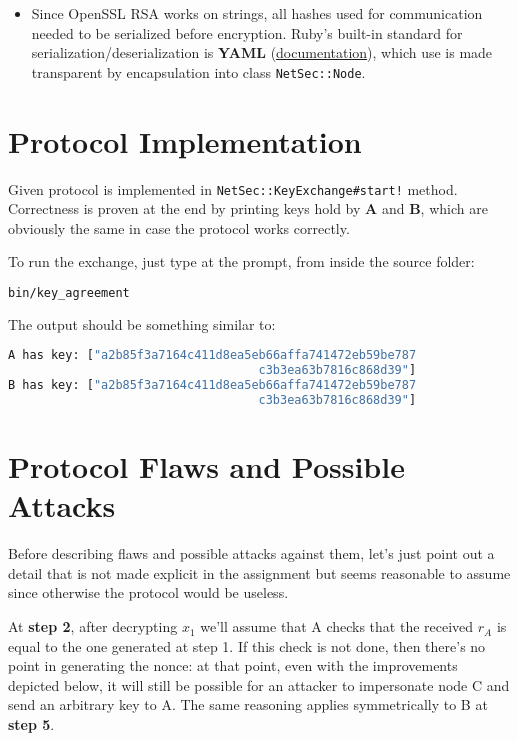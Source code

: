 \documentclass[a4paper,12pt,titlepage]{article}
\begin{document}
\begin{itemize}
	\item Since OpenSSL RSA works on strings, all hashes used for communication needed
  to be serialized before encryption. Ruby's built-in standard for
  serialization/deserialization is \textbf{YAML}
  (\href{http://www.ruby-doc.org/stdlib-2.0/libdoc/yaml/rdoc/YAML.html}{documentation}),
  which use is made transparent by encapsulation into class \texttt{NetSec::Node}.
\end{itemize}

\section{Protocol Implementation}
Given protocol is implemented in \texttt{NetSec::KeyExchange\#start!} method. \\
Correctness is proven at the end by printing keys hold by \textbf{A} and \textbf{B},
which are obviously the same in case the protocol works correctly.

To run the exchange, just type at the prompt, from inside the source folder:

\begin{lstlisting}[language=bash]
bin/key_agreement
\end{lstlisting}

The output should be something similar to:

\begin{lstlisting}[language=bash]
A has key: ["a2b85f3a7164c411d8ea5eb66affa741472eb59be787
                                   c3b3ea63b7816c868d39"]
B has key: ["a2b85f3a7164c411d8ea5eb66affa741472eb59be787
                                   c3b3ea63b7816c868d39"]
\end{lstlisting}

\section{Protocol Flaws and Possible Attacks}
Before describing flaws and possible attacks against them, let's just point out
a detail that is not made explicit in the assignment but seems reasonable
to assume since otherwise the protocol would be useless.

At \textbf{step 2}, after decrypting $x_1$ we'll assume that A checks that the
received $r_A$ is equal to the one generated at step 1. If this check is not
done, then there's no point in generating the nonce: at that point, even with
the improvements depicted below, it will still be possible for an attacker to
impersonate node C and send an arbitrary key to A. The same reasoning applies
symmetrically to B at \textbf{step 5}.
\end{document}
